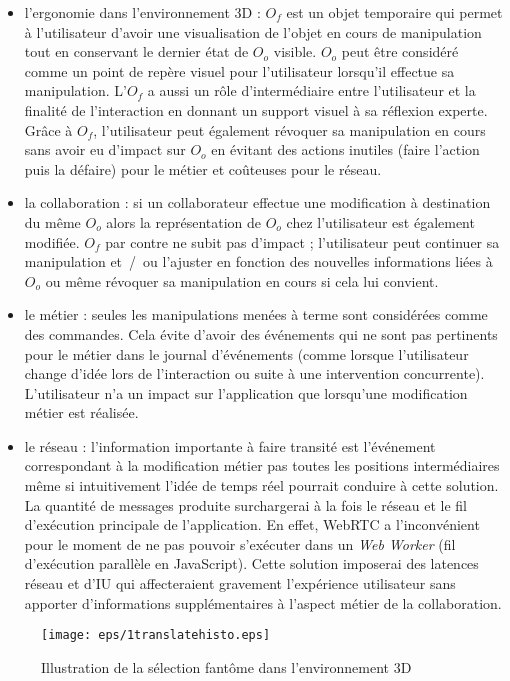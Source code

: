 \begin{itemize}
	\item l'ergonomie dans l'environnement \gls{3D} :
	$O_f$ est un objet temporaire qui permet à l'utilisateur
	d'avoir une visualisation de l'objet en cours de manipulation tout en 
	conservant le dernier état de $O_o$ visible. 
	$O_o$ peut être considéré comme un point de repère visuel pour l'utilisateur 
	lorsqu'il effectue sa manipulation. 
	L'$O_f$ a aussi un rôle d'intermédiaire entre l'utilisateur et la 
	finalité de l'interaction en donnant un support visuel à sa réflexion experte.
	Grâce à $O_f$, l'utilisateur peut également révoquer sa manipulation en 
	cours sans avoir eu d'impact sur $O_o$ en évitant des actions inutiles (faire 
	l'action 
	puis la défaire) pour le métier et coûteuses pour le réseau.
	
	\item la collaboration : si un collaborateur effectue une modification 
	à destination du même $O_o$ alors la représentation de $O_o$ chez 
	l'utilisateur est également modifiée. $O_f$ par contre ne subit pas d'impact ; 
	l'utilisateur peut continuer sa manipulation et~/~ou l'ajuster en fonction des 
	nouvelles informations liées à $O_o$ ou même révoquer sa manipulation 
	en cours si cela lui convient.

	\item le métier : seules les manipulations menées à terme sont 
	considérées comme des commandes. Cela évite d'avoir des événements qui ne 
	sont pas pertinents pour le métier dans le journal d'événements (comme lorsque 
	l'utilisateur change d'idée lors de l'interaction ou
	suite à une intervention concurrente). L'utilisateur n'a un impact sur l'application 
	que lorsqu'une modification métier est réalisée.
	
	\item le réseau : l'information importante à faire transité est l'événement 
	correspondant à la modification métier pas toutes les positions intermédiaires 
	même si intuitivement l'idée de temps réel pourrait conduire à cette solution. La 
	quantité de messages produite surchargerai à la fois le réseau et le fil 
	d'exécution principale de l'application. En effet, \gls{WebRTC} a l'inconvénient 
	pour le 
	moment de ne pas pouvoir s'exécuter dans un \textit{Web Worker} (fil 
	d'exécution 
	parallèle en JavaScript). Cette solution imposerai des 
	latences réseau et d'\gls{IU} qui affecteraient gravement l'expérience utilisateur
	sans apporter d'informations supplémentaires à l'aspect métier de la 
	collaboration. 
\end{itemize}


\begin{figure}[ht]
	\centering
	\texttt{[image: eps/1translatehisto.eps]}
	\caption{Illustration de la sélection fantôme dans l'environnement 3D}
	\label{fig:ghostselection}
\end{figure}